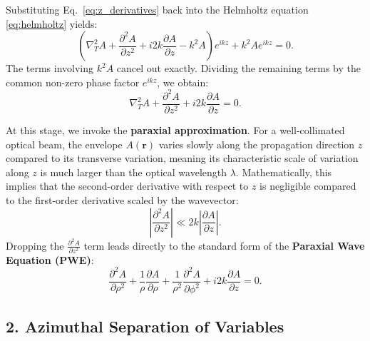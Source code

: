 \begin{resolucao}[Solution]
        Substituting Eq.~\eqref{eq:z_derivatives} back into the Helmholtz equation \eqref{eq:helmholtz} yields:
        \[
        \left( \nabla_T^2 A + \frac{\partial^2 A}{\partial z^2} + i 2k \frac{\partial A}{\partial z} - k^2 A \right) e^{i k z} + k^2 A e^{i k z} = 0.
        \]
        The terms involving $k^2 A$ cancel out exactly. Dividing the remaining terms by the common non-zero phase factor $e^{i k z}$, we obtain:
        \begin{equation}
            \nabla_T^2 A + \frac{\partial^2 A}{\partial z^2} + i 2k \frac{\partial A}{\partial z} = 0.
        \end{equation}
        
        At this stage, we invoke the \textbf{paraxial approximation}. For a well-collimated optical beam, the envelope $A(\mathbf{r})$ varies slowly along the propagation direction $z$ compared to its transverse variation, meaning its characteristic scale of variation along $z$ is much larger than the optical wavelength $\lambda$. Mathematically, this implies that the second-order derivative with respect to $z$ is negligible compared to the first-order derivative scaled by the wavevector:
        \begin{equation}
            \left| \frac{\partial^2 A}{\partial z^2} \right| \ll 2k \left| \frac{\partial A}{\partial z} \right|.
        \end{equation}
        Dropping the $\frac{\partial^2 A}{\partial z^2}$ term leads directly to the standard form of the \textbf{Paraxial Wave Equation (PWE)}:
        \begin{equation}
            \frac{\partial^2 A}{\partial \rho^2} + \frac{1}{\rho}\frac{\partial A}{\partial \rho} + \frac{1}{\rho^2}\frac{\partial^2 A}{\partial \phi^2} + i 2k \frac{\partial A}{\partial z} = 0.
            \label{eq:pwe_cyl_final}
        \end{equation}

    \subsection*{2. Azimuthal Separation of Variables}


\end{resolucao}
